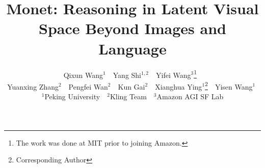 \documentclass[10pt,twocolumn,letterpaper]{article}
\title{Monet: Reasoning in Latent Visual Space Beyond Images and Language}
\author{
    Qixun Wang$^{1}$ \,\,
    Yang Shi$^{1,2}$ \,\,
    Yifei Wang$^{3}$\thanks{The work was done at MIT prior to joining Amazon.} \,\,
    \\
    Yuanxing Zhang$^{2}$ \,\,
    Pengfei Wan$^{2}$ \,\,
    Kun Gai$^{2}$ \,\,
    Xianghua Ying$^{1}$\thanks{Corresponding Author} \,\,
    Yisen Wang$^{1}$\footnotemark[2] \,\,
    \\
    $^{1}$Peking University \,\,
    $^{2}$Kling Team \,\,
    $^{3}$Amazon AGI SF Lab
}
\begin{document}
\maketitle

    






{
    \small
    
    
}


\end{document}
